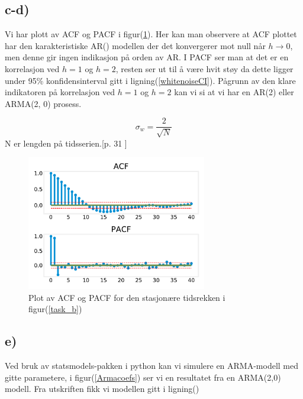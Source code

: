 \subsection{c-d)}

Vi har plott av ACF og PACF i figur(\ref{task_c}). Her kan man observere at ACF plottet har den karakteristiske AR() modellen der det konvergerer mot null når $h \rightarrow 0$, men denne gir ingen indikasjon på orden av AR. I PACF ser man at det er en korrelasjon ved $h = 1$ og $h = 2$, resten ser ut til å være hvit støy da dette ligger under 95\% konfidensinterval gitt i ligning(\ref{whitenoiseCI}). Pågrunn av den klare indikatoren på korrelasjon ved $h = 1$ og $h = 2$ kan vi si at vi har en AR(2) eller ARMA(2, 0) prosess. 

\begin{equation}
    \sigma_{w} = \frac{2}{\sqrt{N}}
\label{whitenoiseCI}
\end{equation}
N er lengden på tidsserien.[p. 31 \cite{Timeseries}]


\begin{figure}[hbt!]
    {\centering
        \includegraphics[width=0.70\textwidth]{task_c.pdf}
        \caption{Plot av ACF og PACF for den stasjonære tidsrekken i figur(\ref{task_b})}
        \label{task_c}
    \par}
    \end{figure}




\subsection{e)}
Ved bruk av statsmodels-pakken i python kan vi simulere en ARMA-modell med gitte parametere, i figur(\ref{Armacoefs}) ser vi en resultatet fra en ARMA(2,0) modell. Fra utskriften fikk vi modellen gitt i ligning()

